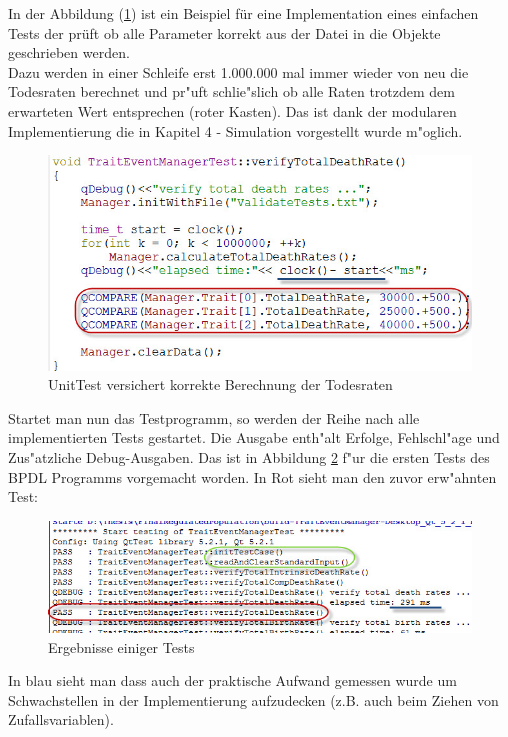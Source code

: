\documentclass[11pt, a4paper, german]{article}
\theoremstyle{plain}
\begin{document}
	In der Abbildung (\ref{Unit Test}) ist ein Beispiel für eine Implementation eines einfachen Tests der prüft ob alle Parameter korrekt aus der Datei in die Objekte geschrieben werden.\\
	Dazu werden in einer Schleife erst 1.000.000 mal immer wieder von neu die Todesraten berechnet und pr"uft schlie"slich ob alle Raten trotzdem dem erwarteten Wert entsprechen (roter Kasten). Das ist dank der modularen Implementierung die in Kapitel 4 - Simulation vorgestellt wurde m"oglich.
	\begin{figure}[H]
		\centering
		\includegraphics[width=1 \linewidth]{./Pictures/UnitTest_death}
		\caption[UnitTest]{UnitTest versichert korrekte Berechnung der Todesraten}
		\label{Unit Test}
	\end{figure}
	Startet man nun das Testprogramm, so werden der Reihe nach alle implementierten Tests gestartet. Die Ausgabe enth"alt Erfolge, Fehlschl"age und Zus"atzliche Debug-Ausgaben. Das ist in Abbildung \ref{Test Results} f"ur die ersten Tests des BPDL Programms vorgemacht worden. In Rot sieht man den zuvor erw"ahnten Test:
	\begin{figure}[H]
		\centering
		\includegraphics[width=1 \linewidth]{./Pictures/TestResult_start_death}
		\caption[Test Resultat einer Test Datei]{Ergebnisse einiger Tests}
		\label{Test Results}
	\end{figure}
	In blau sieht man dass auch der praktische Aufwand gemessen wurde um Schwachstellen in der Implementierung aufzudecken (z.B. auch beim Ziehen von Zufallsvariablen).\\
	
\end{document}
